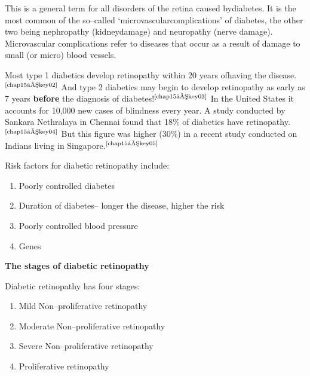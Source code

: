 This is a general term for all disorders of the retina caused by\break diabetes. It is the most common of the so–called ‘microvascular\break complications’ of diabetes, the other two being nephropathy (kidney\break damage) and neuropathy (nerve damage). Microvascular complications refer to diseases that occur as a result of damage to small (or micro) blood vessels.

Most type 1 diabetics develop retinopathy within 20 years of\break having the disease.$^{\text{\cite{chap15–key02}}}$ And type 2 diabetics may begin to develop retino\-pathy as early as 7 years \textbf{before} the diagnosis of diabetes!$^{\text{\cite{chap15–key03}}}$ In the United States it accounts for 10,000 new cases of blindness every year. A study conducted by Sankara Nethralaya in Chennai found that 18\% of diabetics have retinopathy.$^{\text{\cite{chap15–key04}}}$ But this figure was higher (30\%) in a recent study conducted on Indians living in Singapore.$^{\text{\cite{chap15–key05}}}$


\noindent Risk factors for diabetic retinopathy include:

\vspace{-\topsep}
\begin{enumerate}[•]
\itemsep=0pt
\item Poorly controlled diabetes
\item Duration of diabetes– longer the disease, higher the risk
\item Poorly controlled blood pressure
\item Genes
\end{enumerate}

\noindent\textbf{The stages of diabetic retinopathy}

Diabetic retinopathy has four stages:
\begin{enumerate}
\itemsep=0pt
\item Mild Non–proliferative retinopathy
\item Moderate Non–proliferative retinopathy
\item Severe Non–proliferative retinopathy
\item Proliferative retinopathy
\end{enumerate}

